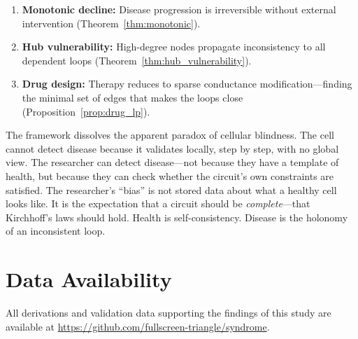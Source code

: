 \documentclass[10pt,twocolumn,a4paper]{article}
\theoremstyle{plain}
\theoremstyle{definition}
\theoremstyle{remark}
\begin{document}
\begin{enumerate}[label=(\arabic*)]
    \item \textbf{Monotonic decline:} Disease progression is irreversible without external intervention (Theorem~\ref{thm:monotonic}).

    \item \textbf{Hub vulnerability:} High-degree nodes propagate inconsistency to all dependent loops (Theorem~\ref{thm:hub_vulnerability}).

    \item \textbf{Drug design:} Therapy reduces to sparse conductance modification---finding the minimal set of edges that makes the loops close (Proposition~\ref{prop:drug_lp}).
\end{enumerate}

The framework dissolves the apparent paradox of cellular blindness. The cell cannot detect disease because it validates locally, step by step, with no global view. The researcher can detect disease---not because they have a template of health, but because they can check whether the circuit's own constraints are satisfied. The researcher's ``bias'' is not stored data about what a healthy cell looks like. It is the expectation that a circuit should be \emph{complete}---that Kirchhoff's laws should hold. Health is self-consistency. Disease is the holonomy of an inconsistent loop.

\section*{Data Availability}

All derivations and validation data supporting the findings of this study are available at \url{https://github.com/fullscreen-triangle/syndrome}.



\end{document}

